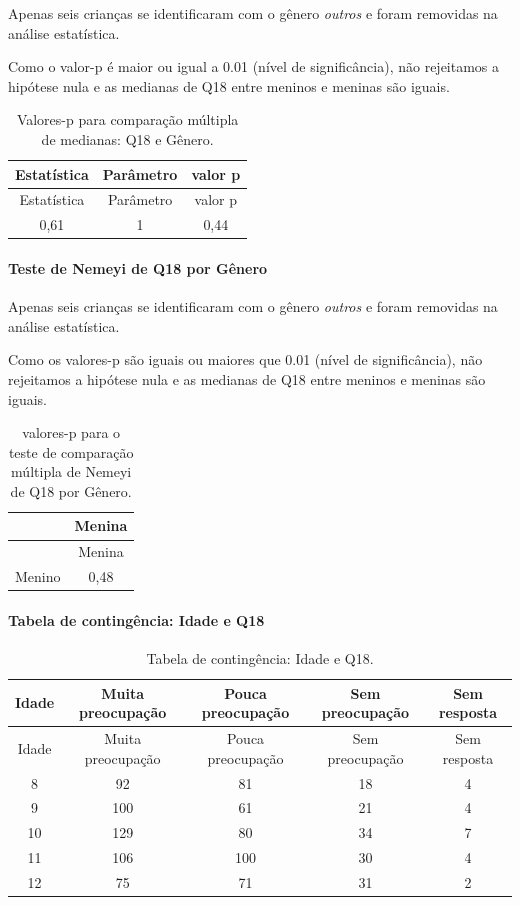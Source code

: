 \documentclass[]{article}
\let\oldparagraph\paragraph
\renewcommand{\paragraph}[1]{\oldparagraph{#1}\mbox{}}
\begin{document}
Apenas seis crianças se identificaram com o gênero \emph{outros} e foram removidas na análise estatística.

Como o valor-p é maior ou igual a 0.01 (nível de significância), não rejeitamos a hipótese nula e as medianas de Q18 entre meninos e meninas são iguais.

\begin{longtable}[]{@{}ccc@{}}
\caption{\label{tab:unnamed-chunk-266}Valores-p para comparação múltipla de medianas: Q18 e Gênero.}\tabularnewline
\toprule
Estatística & Parâmetro & valor p\tabularnewline
\midrule
\endfirsthead
\toprule
Estatística & Parâmetro & valor p\tabularnewline
\midrule
\endhead
0,61 & 1 & 0,44\tabularnewline
\bottomrule
\end{longtable}

\hypertarget{teste-de-nemeyi-de-q18-por-guxeanero}{%
\paragraph{Teste de Nemeyi de Q18 por Gênero}\label{teste-de-nemeyi-de-q18-por-guxeanero}}

Apenas seis crianças se identificaram com o gênero \emph{outros} e foram removidas na análise estatística.

Como os valores-p são iguais ou maiores que 0.01 (nível de significância), não rejeitamos a hipótese nula e as medianas de Q18 entre meninos e meninas são iguais.

\begin{longtable}[]{@{}lc@{}}
\caption{\label{tab:unnamed-chunk-268}valores-p para o teste de comparação múltipla de Nemeyi de Q18 por Gênero.}\tabularnewline
\toprule
& Menina\tabularnewline
\midrule
\endfirsthead
\toprule
& Menina\tabularnewline
\midrule
\endhead
Menino & 0,48\tabularnewline
\bottomrule
\end{longtable}

\cleardoublepage

\hypertarget{tabela-de-continguxeancia-idade-e-q18}{%
\paragraph{Tabela de contingência: Idade e Q18}\label{tabela-de-continguxeancia-idade-e-q18}}

\begin{longtable}[]{@{}ccccc@{}}
\caption{\label{tab:unnamed-chunk-269}Tabela de contingência: Idade e Q18.}\tabularnewline
\toprule
Idade & Muita preocupação & Pouca preocupação & Sem preocupação & Sem resposta\tabularnewline
\midrule
\endfirsthead
\toprule
Idade & Muita preocupação & Pouca preocupação & Sem preocupação & Sem resposta\tabularnewline
\midrule
\endhead
8 & 92 & 81 & 18 & 4\tabularnewline
9 & 100 & 61 & 21 & 4\tabularnewline
10 & 129 & 80 & 34 & 7\tabularnewline
11 & 106 & 100 & 30 & 4\tabularnewline
12 & 75 & 71 & 31 & 2\tabularnewline
\bottomrule
\end{longtable}
\end{document}
